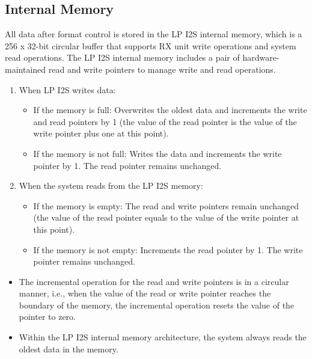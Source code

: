 \documentclass[main\_\_EN.tex]{subfiles}
\begin{document}
\subsection{Internal Memory}
\label{sec:lpi2s-memory}

All data after format control is stored in the LP I2S internal memory, which is a 256 x 32-bit circular buffer that supports RX unit write operations and system read operations. The LP I2S internal memory includes a pair of hardware-maintained read and write pointers to manage write and read operations.

\begin{enumerate}
    \item When LP I2S writes data:
    \begin{itemize}
        \item If the memory is full: Overwrites the oldest data and increments the write and read pointers by 1 (the value of the read pointer is the value of the write pointer plus one at this point).
        \item If the memory is not full: Writes the data and increments the write pointer by 1. The read pointer remains unchanged.
    \end{itemize}
    \item When the system reads from the LP I2S memory:
    \begin{itemize}
        \item If the memory is empty: The read and write pointers remain unchanged (the value of the read pointer equals to the value of the write pointer at this point).
        \item If the memory is not empty: Increments the read pointer by 1. The write pointer remains unchanged.
    \end{itemize}
    \end{enumerate}

\begin{tiplisting}
\vspace{-2em}
\begin{itemize}
    \item The incremental operation for the read and write pointers is in a circular manner, i.e., when the value of the read or write pointer reaches the boundary of the memory, the incremental operation resets the value of the pointer to zero.
    \item Within the LP I2S internal memory architecture, the system always reads the oldest data in the memory.
\end{itemize}
\end{tiplisting}
\end{document}
